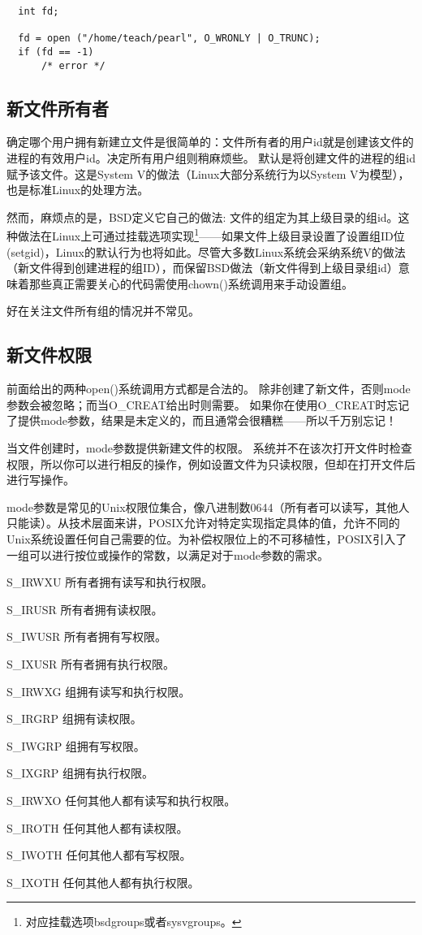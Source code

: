 \begin{lstlisting}
  int fd;
 
  fd = open ("/home/teach/pearl", O_WRONLY | O_TRUNC);
  if (fd == -1)
      /* error */
\end{lstlisting}

\subsection{新文件所有者}
确定哪个用户拥有新建立文件是很简单的：文件所有者的用户id就是创建该文件的进程的有效用户id。决定所有用户组则稍麻烦些。 默认是将创建文件的进程的组id赋予该文件。这是System V的做法（Linux大部分系统行为以System V为模型），也是标准Linux的处理方法。

然而，麻烦点的是，BSD定义它自己的做法: 文件的组定为其上级目录的组id。这种做法在Linux上可通过挂载选项实现\footnote[1]{对应挂载选项bsdgroups或者sysvgroups。}——如果文件上级目录设置了设置组ID位(setgid)，Linux的默认行为也将如此。尽管大多数Linux系统会采纳系统V的做法（新文件得到创建进程的组ID），而保留BSD做法（新文件得到上级目录组id）意味着那些真正需要关心的代码需使用chown()系统调用来手动设置组。

好在关注文件所有组的情况并不常见。 

\subsection{新文件权限}
前面给出的两种open()系统调用方式都是合法的。 除非创建了新文件，否则mode参数会被忽略；而当O\_CREAT给出时则需要。 如果你在使用O\_CREAT时忘记了提供mode参数，结果是未定义的，而且通常会很糟糕——所以千万别忘记！

当文件创建时，mode参数提供新建文件的权限。 系统并不在该次打开文件时检查权限，所以你可以进行相反的操作，例如设置文件为只读权限，但却在打开文件后进行写操作。

mode参数是常见的Unix权限位集合，像八进制数0644（所有者可以读写，其他人只能读）。从技术层面来讲，POSIX允许对特定实现指定具体的值，允许不同的Unix系统设置任何自己需要的位。为补偿权限位上的不可移植性，POSIX引入了一组可以进行按位或操作的常数，以满足对于mode参数的需求。 

\begin{eqlist*}
\item [S\_IRWXU]
所有者拥有读写和执行权限。 
\item [S\_IRUSR]
所有者拥有读权限。 
\item [S\_IWUSR]
所有者拥有写权限。 
\item [S\_IXUSR]
所有者拥有执行权限。 
\item [S\_IRWXG]
组拥有读写和执行权限。 
\item [S\_IRGRP]
组拥有读权限。 
\item [S\_IWGRP]
组拥有写权限。 
\item [S\_IXGRP]
组拥有执行权限。
\item [S\_IRWXO]
任何其他人都有读写和执行权限。 
\item [S\_IROTH]
任何其他人都有读权限。 
\item [S\_IWOTH]
任何其他人都有写权限。 
\item [S\_IXOTH]
任何其他人都有执行权限。 
\end{eqlist*}

